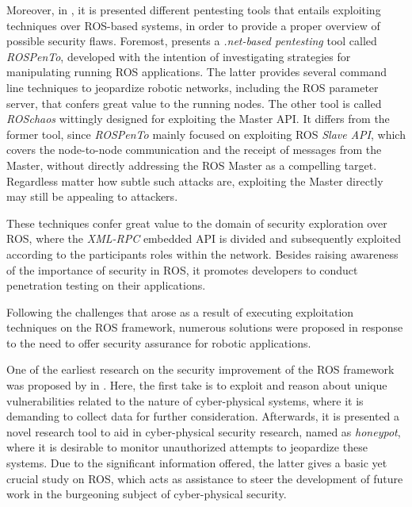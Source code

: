 Moreover, in , it is presented different pentesting tools that entails exploiting techniques over ROS-based systems, in order to provide a proper overview of possible security flaws. Foremost, \citeauthor{dieber2020penetration} presents a \textit{.net-based pentesting} tool called \textit{ROSPenTo}, developed with the intention of investigating strategies for manipulating running ROS applications. The latter provides several command line techniques to jeopardize robotic networks, including the ROS parameter server, that confers great value to the running nodes. The other tool is called \textit{ROSchaos} wittingly designed for exploiting the Master API. It differs from the former tool, since \textit{ROSPenTo} mainly focused on exploiting ROS \textit{Slave API}, which covers the node-to-node communication and the receipt of messages from the Master, without directly addressing the ROS Master as a compelling target. Regardless matter how subtle such attacks are, exploiting the Master directly may still be appealing to attackers. 

These techniques confer great value to the domain of security exploration over ROS, where the \textit{XML-RPC} embedded API is divided and subsequently exploited according to the participants roles within the network. Besides raising awareness of the importance of security in ROS, it promotes developers to conduct penetration testing on their applications.

Following the challenges that arose as a result of executing exploitation techniques on the ROS framework, numerous solutions were proposed in response to the need to offer security assurance for robotic applications. 

One of the earliest research on the security improvement of the ROS framework was proposed by \citeauthor{mcclean2013preliminary} in . Here, the first take is to exploit and reason about unique vulnerabilities related to the nature of cyber-physical systems, where it is demanding to collect data for further consideration. Afterwards, it is presented a novel research tool to aid in cyber-physical security research, named as \textit{honeypot}, where it is desirable to monitor unauthorized attempts to jeopardize these systems. Due to the significant information offered, the latter gives a basic yet crucial study on ROS, which acts as assistance to steer the development of future work in the burgeoning subject of cyber-physical security. 


